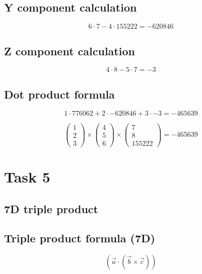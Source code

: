 \documentclass{article}
\begin{document}
\subsection*{ \vspace{1em} Y component calculation}
\[
6 \cdot 7 - 4 \cdot 155222 = -620846
\]
\subsection*{ \vspace{1em} Z component calculation}
\[
4 \cdot 8 - 5 \cdot 7 = -3
\]
\subsection*{ \vspace{1em} Dot product formula}
\[
1 \cdot 776062 + 2 \cdot -620846 + 3 \cdot -3 = -465639
\]
\medskip

\[
\begin{pmatrix}1 \\ 2 \\ 3\end{pmatrix} \times \begin{pmatrix}4 \\ 5 \\ 6\end{pmatrix} \times \begin{pmatrix}7 \\ 8 \\ 155222\end{pmatrix} = -465639
\]
\bigskip

\hrulefill
\bigskip

\section*{Task 5}

\subsection*{7D triple product}
\subsection*{ \vspace{1em} Triple product formula (7D)}
\[
(\vec{a} \cdot (\vec{b} \times \vec{c}))
\]
\end{document}
